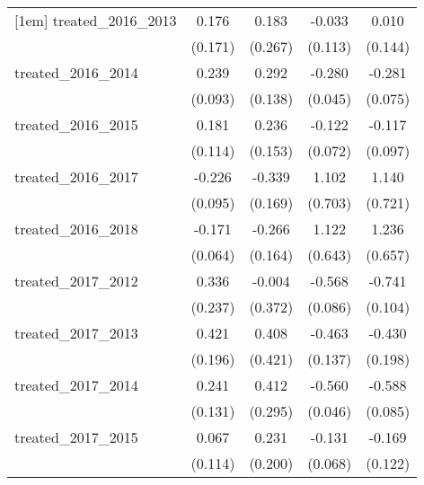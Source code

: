 {\begin{tabular}{l*{4}{c}}
[1em]
treated\_2016\_2013&       0.176         &       0.183         &      -0.033         &       0.010         \\
            &     (0.171)         &     (0.267)         &     (0.113)         &     (0.144)         \\
[1em]
treated\_2016\_2014&       0.239\sym{*}  &       0.292\sym{*}  &      -0.280\sym{***}&      -0.281\sym{***}\\
            &     (0.093)         &     (0.138)         &     (0.045)         &     (0.075)         \\
[1em]
treated\_2016\_2015&       0.181         &       0.236         &      -0.122         &      -0.117         \\
            &     (0.114)         &     (0.153)         &     (0.072)         &     (0.097)         \\
[1em]
treated\_2016\_2017&      -0.226\sym{*}  &      -0.339\sym{*}  &       1.102         &       1.140         \\
            &     (0.095)         &     (0.169)         &     (0.703)         &     (0.721)         \\
[1em]
treated\_2016\_2018&      -0.171\sym{**} &      -0.266         &       1.122         &       1.236         \\
            &     (0.064)         &     (0.164)         &     (0.643)         &     (0.657)         \\
[1em]
treated\_2017\_2012&       0.336         &      -0.004         &      -0.568\sym{***}&      -0.741\sym{***}\\
            &     (0.237)         &     (0.372)         &     (0.086)         &     (0.104)         \\
[1em]
treated\_2017\_2013&       0.421\sym{*}  &       0.408         &      -0.463\sym{***}&      -0.430\sym{*}  \\
            &     (0.196)         &     (0.421)         &     (0.137)         &     (0.198)         \\
[1em]
treated\_2017\_2014&       0.241         &       0.412         &      -0.560\sym{***}&      -0.588\sym{***}\\
            &     (0.131)         &     (0.295)         &     (0.046)         &     (0.085)         \\
[1em]
treated\_2017\_2015&       0.067         &       0.231         &      -0.131         &      -0.169         \\
            &     (0.114)         &     (0.200)         &     (0.068)         &     (0.122)         \\

\end{tabular}}
